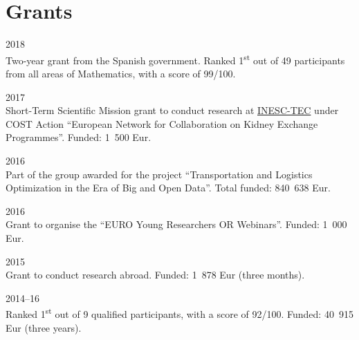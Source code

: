 \newpage
\section*{Grants}

\begin{paracol}{2}
  \textsc{2018}
\switchcolumn
  \\
  Two-year grant from the Spanish government.
  Ranked 1\textsuperscript{st} out of 49 participants from all areas of Mathematics, with a score of 99/100.
\end{paracol}

\begin{paracol}{2}
  \textsc{2017}
\switchcolumn
  \\
  Short-Term Scientific Mission grant to conduct research at \href{https://www.inesctec.pt/}{INESC-TEC} under COST Action ``European Network for Collaboration on Kidney Exchange Programmes''.
  Funded: 1~500 Eur.
\end{paracol}

\begin{paracol}{2}
  \textsc{2016}
\switchcolumn
  \\
  Part of the group awarded for the project ``Transportation and Logistics Optimization in the Era of Big and Open Data''.
  Total funded: 840~638 Eur.
\end{paracol}

\begin{paracol}{2}
  \textsc{2016}
\switchcolumn
  \\
  Grant to organise the ``EURO Young Researchers OR Webinars''.
  Funded: 1~000 Eur.
\end{paracol}

\begin{paracol}{2}
  \textsc{2015}
\switchcolumn
  \\
  Grant to conduct research abroad.
  Funded: 1~878 Eur (three months).
\end{paracol}

\begin{paracol}{2}
  \textsc{2014--16}
\switchcolumn
  \\
  Ranked 1\textsuperscript{st} out of 9 qualified participants, with a score of 92/100.
  Funded: 40~915 Eur (three years).
\end{paracol}
